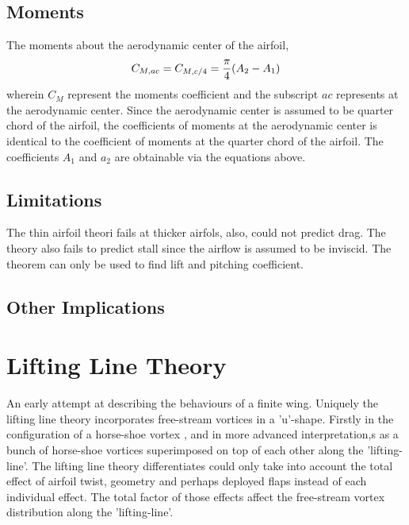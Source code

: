 \documentclass[a4paper, 12pt]{report}
\begin{document}
\begin{center}
\subsection{Moments}
\begin{comment}
\end{comment}
The moments about the aerodynamic center of the airfoil,
$$C_{M,ac} = C_{M,c/4} = \frac{\pi}{4}(A_2 - A_1)$$
wherein $C_M$ represent the moments coefficient and the subscript $ac$ represents at the aerodynamic center. Since the aerodynamic center is assumed to be quarter chord of the airfoil, the coefficients of moments at the aerodynamic center is identical to the coefficient of moments at the quarter chord of the airfoil. The coefficients $A_1$ and $a_2$ are obtainable via the equations above.
\subsection{Limitations}
\begin{comment}
\end{comment}
The thin airfoil theori fails at thicker airfols, also, could not predict drag. The theory also fails to predict stall since the airflow is assumed to be inviscid. The theorem can only be used to find lift and pitching coefficient.
\subsection{Other Implications}
\begin{comment}
\end{comment}
\section{Lifting Line Theory}
\begin{comment}
\end{comment}
An early attempt at describing the behaviours of a finite wing. Uniquely the lifting line theory incorporates free-stream vortices in a 'u'-shape. Firstly in the configuration of a horse-shoe vortex , and in more advanced interpretation,s as a bunch of horse-shoe vortices superimposed on top of each other along the 'lifting-line'. The lifting line theory differentiates could only take into account the total effect of airfoil twist, geometry and perhaps deployed flaps instead of each individual effect. The total factor of those effects affect the free-stream vortex distribution along the 'lifting-line'. 

\end{center}
\end{document}
